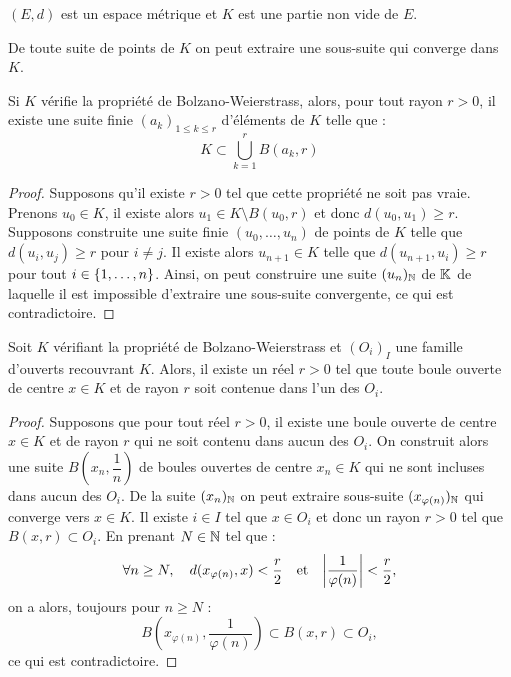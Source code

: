 \begin{nota}
$(E,d)$ est un espace métrique et $K$ est une partie non vide de $E$.
\end{nota}

\begin{prop}
De toute suite de points de $K$ on peut extraire une sous-suite qui converge dans $K$.
\end{prop}

\begin{lem}
\label{lem:1}
Si $K$ vérifie la propriété de Bolzano-Weierstrass, alors, pour tout rayon $r > 0$, 
il existe une suite finie $(a_k)_{1 \leq k \leq r}$ d'éléments de $K$ telle que :
\[ K \subset \bigcup_{k=1}^r B(a_k, r) \]
\end{lem}

\begin{proof}
Supposons qu'il existe $r > 0$ tel que cette propriété ne soit pas vraie. 
Prenons $u_0 \in K$, il existe alors $u_1 \in K \setminus B(u_0, r)$ et donc $d(u_0, u_1) \geq r$.
Supposons construite une suite finie $(u_0, \dots, u_n)$ de points de $K$ telle que $d(u_i, u_j) \geq r$ pour $i \neq j$.
Il existe alors $u_{n+1} \in K$ telle que $d(u_{n+1}, u_i) \geq r$ pour tout $i \in \{ 1, \dots, n \}$. 
Ainsi, on peut construire une suite $(u_n)_{\mathbb{N}}$ de $\mathbb{K}$ de laquelle il est impossible d'extraire une sous-suite convergente, ce qui est
contradictoire.
\end{proof}

\begin{lem}
\label{lem:2}
Soit $K$ vérifiant la propriété de Bolzano-Weierstrass et $(O_i)_I$ une famille d'ouverts recouvrant $K$.
Alors, il existe un réel $r>0$ tel que toute boule ouverte de centre $x \in K$ et de rayon $r$ soit contenue dans l'un des $O_i$.
\end{lem}

\begin{proof}
Supposons que pour tout réel $r>0$, il existe une boule ouverte de centre $x \in K$ et de rayon $r$ qui ne soit contenu dans aucun
des $O_i$. On construit alors une suite $B \left ( x_n, \dfrac1{n} \right )$ de boules ouvertes de centre $x_n \in K$ qui ne sont incluses
dans aucun des $O_i$. De la suite $(x_n)_{\mathbb{N}}$ on peut extraire sous-suite $(x_{\varphi(n)})_{\mathbb{N}}$ qui converge vers $x \in K$.
Il existe $i \in I$ tel que $x \in O_i$ et donc un rayon $r>0$ tel que $B(x, r) \subset O_i$.
En prenant $N \in \mathbb{N}$ tel que :
\[ \forall n \geq N, \quad d(x_{\varphi(n)}, x) < \dfrac{r}2 \et \abs*{\dfrac1{\varphi(n)}} < \dfrac{r}2, \]
on a alors, toujours pour $n \geq N$ :
\[ B \left ( x_{\varphi(n)}, \dfrac1{\varphi(n)} \right ) \subset B(x, r) \subset O_i , \]
ce qui est contradictoire.
\end{proof}

